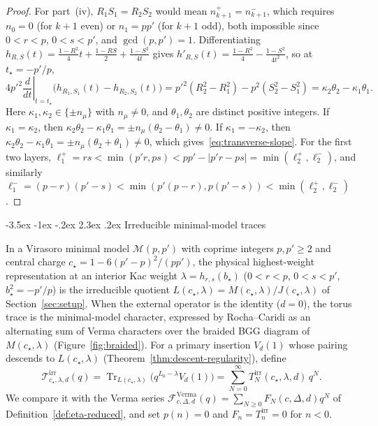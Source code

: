 \documentclass[twoside,10pt]{article}
\makeatletter
\numberwithin{equation}{section}
\theoremstyle{slbody}
\theoremstyle{definition}
\theoremstyle{remark}
\newcommand{\Tr}{\operatorname{Tr}}
\renewcommand{\section}{%
  \@startsection{section}{1}{\z@}%
    {-3.5ex \@plus -1ex \@minus -.2ex}%
    {2.3ex \@plus .2ex}%
    {\normalfont\large\bfseries}}
\makeatother
\begin{document}
\begin{proof}
For part~(iv), \(R_1S_1=R_2S_2\) would mean \(n^+_{k+1}=n^-_{k+1}\), which
requires \(n_0=0\) (for \(k+1\) even) or \(n_1=pp'\) (for \(k+1\) odd), both
impossible since \(0<r<p\), \(0<s<p'\), and \(\gcd(p,p')=1\).  Differentiating
\(h_{R,S}(t)=\frac{1-R^2}{4}t+\frac{1-RS}{2}+\frac{1-S^2}{4t}\) gives
\(h'_{R,S}(t)=\frac{1-R^2}{4}-\frac{1-S^2}{4t^2}\), so at \(t_\star=-p'/p\),
\[
 4p'^2\left.\frac{d}{dt}\right|_{t=t_\star}
 \bigl(h_{R_1,S_1}(t)-h_{R_2,S_2}(t)\bigr)
 =p'^2(R_2^2-R_1^2)-p^2(S_2^2-S_1^2)
 =\kappa_2\theta_2-\kappa_1\theta_1.
\]
Here \(\kappa_1,\kappa_2\in\{\pm n_\mu\}\) with \(n_\mu\neq0\), and
\(\theta_1,\theta_2\) are distinct positive integers.  If
\(\kappa_1=\kappa_2\), then
\(\kappa_2\theta_2-\kappa_1\theta_1=\pm n_\mu(\theta_2-\theta_1)\neq0\).  If
\(\kappa_1=-\kappa_2\), then
\(\kappa_2\theta_2-\kappa_1\theta_1=\pm n_\mu(\theta_2+\theta_1)\neq0\), which
gives~\eqref{eq:transverse-slope}.  For the first two layers,
\(\ell^+_1=rs<\min(p'r,ps)<pp'-|p'r-ps|=\min(\ell^+_2,\ell^-_2)\), and
similarly \(\ell^-_1=(p-r)(p'-s)<\min(p'(p-r),p(p'-s))<\min(\ell^+_2,\ell^-_2)\).
\end{proof}

\section{Irreducible minimal-model traces}\label{sec:irr-results}

In a Virasoro minimal model \(\mathcal{M}(p,p')\) with coprime integers
\(p,p'\geq2\) and central charge \(c_\star=1-6(p'-p)^2/(pp')\), the physical
highest-weight representation at an interior Kac weight
\(\lambda=h_{r,s}(b_\star)\) (\(0<r<p\), \(0<s<p'\), \(b_\star^2=-p'/p\)) is the
irreducible quotient \(L(c_\star,\lambda)=M(c_\star,\lambda)/J(c_\star,\lambda)\)
of Section~\ref{sec:setup}.  When the external operator is the identity (\(d=0\)),
the torus trace is the minimal-model character, expressed by Rocha--Caridi
\cite{RochaCaridi1985} as an alternating sum of Verma characters over the
braided BGG diagram of \(M(c_\star,\lambda)\) (Figure~\ref{fig:braided}).  For a
primary insertion \(V_d(1)\) whose pairing descends to \(L(c_\star,\lambda)\)
(Theorem~\ref{thm:descent-regularity}), define
\begin{equation}\label{eq:irr-trace-def}
 \mathcal{T}^{\mathrm{irr}}_{c_\star,\lambda,d}(q)
 =\Tr_{L(c_\star,\lambda)}\bigl(q^{L_0-\lambda}V_d(1)\bigr)
 =\sum_{N=0}^\infty T^{\mathrm{irr}}_N(c_\star,\lambda,d)\,q^N.
\end{equation}
We compare it with the Verma series
\(\mathcal{F}^{\mathrm{Verma}}_{c,\Delta,d}(q)=\sum_{N\geq0}F_N(c,\Delta,d)q^N\)
of Definition~\ref{def:eta-reduced}, and set \(p(n)=0\) and
\(F_n=T^{\mathrm{irr}}_n=0\) for \(n<0\).
\end{document}
